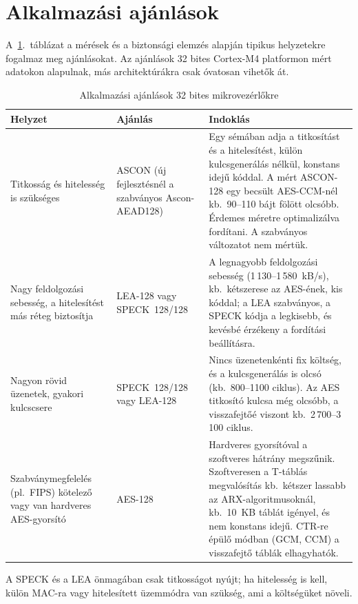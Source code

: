 \documentclass[a4paper,12pt]{report}
\theoremstyle{definition}
\theoremstyle{remark}
\begin{document}
\section{Alkalmazási ajánlások}

A~\ref{tab:ajanlasok}.~táblázat a mérések és a biztonsági elemzés alapján tipikus helyzetekre fogalmaz meg ajánlásokat. Az ajánlások 32 bites Cortex-M4 platformon mért adatokon alapulnak, más architektúrákra csak óvatosan vihetők át.

\begin{table}[htbp]
    \centering
    \small
    \caption{Alkalmazási ajánlások 32 bites mikrovezérlőkre}
    \label{tab:ajanlasok}
    \begin{tabularx}{\textwidth}{|p{4.2cm}|p{3.0cm}|X|}
        \hline
        \textbf{Helyzet} & \textbf{Ajánlás} & \textbf{Indoklás} \\ \hline
        Titkosság és hitelesség is szükséges & ASCON (új fejlesztésnél a szabványos Ascon-AEAD128) & Egy sémában adja a titkosítást és a hitelesítést, külön kulcsgenerálás nélkül, konstans idejű kóddal. A mért ASCON-128 egy becsült AES-CCM-nél kb.\ 90--110 bájt fölött olcsóbb. Érdemes méretre optimalizálva fordítani. A szabványos változatot nem mértük. \\ \hline
        Nagy feldolgozási sebesség, a hitelesítést más réteg biztosítja & LEA-128 vagy SPECK~128/128 & A legnagyobb feldolgozási sebesség (1\,130--1\,580~kB/s), kb.\ kétszerese az AES-ének, kis kóddal; a LEA szabványos, a SPECK kódja a legkisebb, és kevésbé érzékeny a fordítási beállításra. \\ \hline
        Nagyon rövid üzenetek, gyakori kulcscsere & SPECK~128/128 vagy LEA-128 & Nincs üzenetenkénti fix költség, és a kulcsgenerálás is olcsó (kb.\ 800--1100 ciklus). Az AES titkosító kulcsa még olcsóbb, a visszafejtőé viszont kb.\ 2\,700--3\,100 ciklus. \\ \hline
        Szabványmegfelelés (pl.\ FIPS) kötelező vagy van hardveres AES-gyorsító & AES-128 & Hardveres gyorsítóval a szoftveres hátrány megszűnik. Szoftveresen a T-táblás megvalósítás kb.\ kétszer lassabb az ARX-algoritmusoknál, kb.\ 10~KB táblát igényel, és nem konstans idejű. CTR-re épülő módban (GCM, CCM) a visszafejtő táblák elhagyhatók. \\ \hline
    \end{tabularx}
\end{table}

A SPECK és a LEA önmagában csak titkosságot nyújt; ha hitelesség is kell, külön MAC-ra vagy hitelesített üzemmódra van szükség, ami a költségüket növeli.
\end{document}
